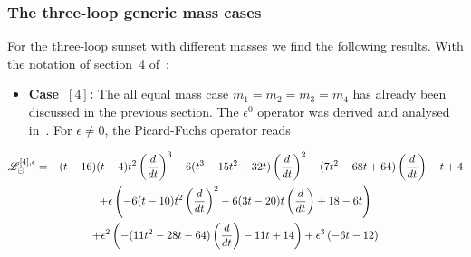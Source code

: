 \documentclass[a4paper,12pt]{article}
\numberwithin{equation}{section}
\numberwithin{figure}{section}
\def\su{\circleddash}
\begin{document}

\subsubsection{The three-loop generic mass cases}\label{sec:threeloop}

For the three-loop sunset with different masses we find the following
results. With the notation of section~4 of~\cite{Lairez:2022zkj}:
%
\begin{itemize}
\item  {\bf Case~$[4]$:} The all equal mass case $m_1=m_2=m_3=m_4$ has already been
  discussed in the previous section. The $\epsilon^0$ operator was derived and analysed in~\cite{Vanhove:2014wqa,Bloch:2014qca,Pogel:2022yat}. For $ \epsilon \ne 0$, the Picard-Fuchs operator reads
   \end{itemize}
  \begin{multline}
    \mathscr{L}_\su^{[4],\epsilon}=
    -(t - 16)  (t - 4)  t^2\left(d\over dt\right)^3 - 6  (t^3 -
                              15  t^2 + 32  t)  \left(d\over dt\right)^2 - (7  t^2 - 68  t +
                              64)  \left(d\over dt\right) - t + 4\cr
                              +\epsilon \left(-6  (t - 10  ) t^2 \left(d\over dt\right)^2 -
      6  (3  t - 20  ) t \left(d\over dt\right) +18- 6  t 
      \right)\cr
    +\epsilon^2\left(-(11  t^2 -
      28  t - 64)  \left(d\over dt\right) - 11  t + 14\right)+ \epsilon^3\left(-6  t - 12\right)
  \end{multline}
\end{document}
